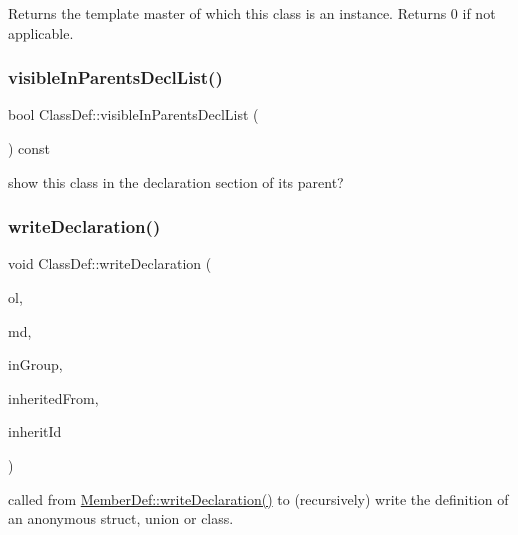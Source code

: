 Returns the template master of which this class is an instance. Returns 0 if not applicable. \mbox{\label{class_class_def_ae593150ad67e83a461c3a1105c50e97d}} 
\subsubsection{\texorpdfstring{visibleInParentsDeclList()}{visibleInParentsDeclList()}}
{\footnotesize\ttfamily bool Class\+Def\+::visible\+In\+Parents\+Decl\+List (\begin{DoxyParamCaption}{ }\end{DoxyParamCaption}) const}

show this class in the declaration section of its parent? \mbox{\label{class_class_def_ab9701f34d56e4dfee3e4ccd2fd6a6f5b}} 
\subsubsection{\texorpdfstring{writeDeclaration()}{writeDeclaration()}}
{\footnotesize\ttfamily void Class\+Def\+::write\+Declaration (\begin{DoxyParamCaption}\item[{\mbox{\hyperlink{class_output_list}{Output\+List}} \&}]{ol,  }\item[{\mbox{\hyperlink{class_member_def}{Member\+Def}} $\ast$}]{md,  }\item[{bool}]{in\+Group,  }\item[{\mbox{\hyperlink{class_class_def}{Class\+Def}} $\ast$}]{inherited\+From,  }\item[{const char $\ast$}]{inherit\+Id }\end{DoxyParamCaption})}

called from \mbox{\hyperlink{class_member_def_a73f56d5c2ca4ec4807a94c272d752e13}{Member\+Def\+::write\+Declaration()}} to (recursively) write the definition of an anonymous struct, union or class. \mbox{\label{class_class_def_a5c0ec6a3c4ebf12f8c703dbdfdc36e97}} 
